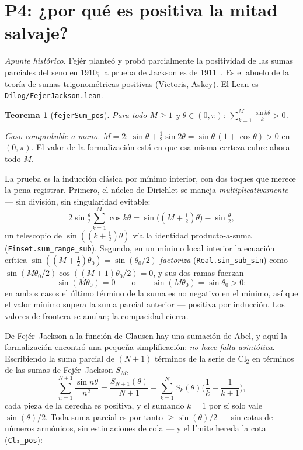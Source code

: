 \documentclass[11pt]{article}
\newtheorem{theorem}{Teorema}
\newcommand{\lean}[1]{\texttt{#1}}
\newcommand{\Cl}{\mathrm{Cl}_2}
\newcommand{\keyeq}[1]{\begin{center}\keybox{$\displaystyle #1$}\end{center}}
\begin{document}
\section{P4: ¿por qu\'e es positiva la mitad salvaje?}\label{sec:fejer}

\emph{Apunte hist\'orico.} Fej\'er plante\'o y prob\'o parcialmente la positividad de
las sumas parciales del seno en 1910; la prueba de Jackson es de
1911~\cite{fejer,jackson}. Es el abuelo de la teor\'ia de sumas trigonom\'etricas
positivas (Vietoris, Askey). El Lean es \lean{Dilog/FejerJackson.lean}.

\begin{theorem}[{\lean{fejerSum\_pos}}]\label{thm:fj}
Para todo $M\ge1$ y $\theta\in(0,\pi)$:
$\displaystyle\sum_{k=1}^{M}\frac{\sin k\theta}{k}>0$.
\end{theorem}

\emph{Caso comprobable a mano.} $M=2$:
$\sin\theta+\tfrac12\sin2\theta=\sin\theta\,(1+\cos\theta)>0$ en $(0,\pi)$. El valor de
la formalizaci\'on est\'a en que esa misma certeza cubre ahora todo $M$.

La prueba es la inducci\'on cl\'asica por m\'inimo interior, con dos toques que merece
la pena registrar. Primero, el n\'ucleo de Dirichlet se maneja
\emph{multiplicativamente} --- sin divisi\'on, sin singularidad evitable:
\[
2\sin\tfrac{\theta}{2}\sum_{k=1}^{M}\cos k\theta
=\sin\!\big((M+\tfrac12)\theta\big)-\sin\tfrac{\theta}{2},
\]
un telescopio de $\sin((k+\tfrac12)\theta)$ v\'ia la identidad producto-a-suma
(\lean{Finset.sum\_range\_sub}). Segundo, en un m\'inimo local interior la ecuaci\'on
cr\'itica $\sin((M+\tfrac12)\theta_0)=\sin(\theta_0/2)$ \emph{factoriza}
(\lean{Real.sin\_sub\_sin}) como
$\sin(M\theta_0/2)\cos((M{+}1)\theta_0/2)=0$, y sus dos ramas fuerzan
\[
\sin(M\theta_0)=0
\qquad\text{o}\qquad
\sin(M\theta_0)=\sin\theta_0>0:
\]
en ambos casos el \'ultimo t\'ermino de la suma es no negativo en el m\'inimo, as\'i que
el valor m\'inimo supera la suma parcial anterior --- positiva por inducci\'on. Los
valores de frontera se anulan; la compacidad cierra.

De Fej\'er--Jackson a la funci\'on de Clausen hay una sumaci\'on de Abel, y aqu\'i la
formalizaci\'on encontr\'o una peque\~na simplificaci\'on: \emph{no hace falta
asint\'otica}. Escribiendo la suma parcial de $(N{+}1)$ t\'erminos de la serie de $\Cl$
en t\'erminos de las sumas de Fej\'er--Jackson $S_M$,
\[
\sum_{n=1}^{N+1}\frac{\sin n\theta}{n^2}
=\frac{S_{N+1}(\theta)}{N+1}
+\sum_{k=1}^{N}S_k(\theta)\Big(\frac{1}{k}-\frac{1}{k+1}\Big),
\]
cada pieza de la derecha es positiva, y el sumando $k=1$ por s\'i solo vale
$\sin(\theta)/2$. Toda suma parcial es por tanto $\ge\sin(\theta)/2$ --- sin cotas de
n\'umeros arm\'onicos, sin estimaciones de cola --- y el l\'imite hereda la cota
(\lean{Cl₂\_pos}):
\keyeq{\Cl(\theta)\;\ge\;\frac{\sin\theta}{2}\;>\;0\qquad(0<\theta<\pi).}
\end{document}
